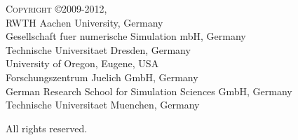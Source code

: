 \textsc{\Large Copyright \copyright 2009-2012,} \\ \hspace*{10mm}
   RWTH Aachen University, Germany \\ \hspace*{10mm}
   Gesellschaft fuer numerische Simulation mbH, Germany \\ \hspace*{10mm}
   Technische Universitaet Dresden, Germany \\ \hspace*{10mm}
   University of Oregon, Eugene, USA \\ \hspace*{10mm}
   Forschungszentrum Juelich GmbH, Germany \\ \hspace*{10mm}
   German Research School for Simulation Sciences GmbH, Germany \\ \hspace*{10mm}
   Technische Universitaet Muenchen, Germany

All rights reserved.
\vfill 

